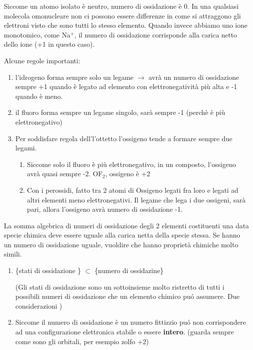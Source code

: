 \documentclass[a4paper]{article}
\begin{document}
Siccome un atomo isolato è neutro, numero di ossidazione è 0. In una qualsiasi molecola omonucleare non ci possono essere differenze in come si attraggono gli elettroni visto che sono tutti lo stesso elemento. Quando invece abbiamo uno ione monotomico, come Na$^+$, il numero di ossidazione corrisponde alla carica netto dello ione (+1 in questo caso).

Alcune regole importanti:
\begin{enumerate}
    \item l'idrogeno forma sempre solo un legame $\rightarrow$ avrà un numero di ossidazione sempre +1 quando è legato ad elemento con elettronegatività più alta e -1 quando è meno. 
    \item il fluoro forma sempre un legame singolo, sarà sempre -1 (perchè è più elettronegativo)
    \item Per soddisfare regola dell'l'ottetto l'ossigeno tende a formare sempre due legami. \begin{enumerate}
        \item Siccome solo il fluoro è più elettronegativo, in un composto, l'ossigeno avrà quasi sempre -2. OF$_2$, ossigeno è +2
        \item Con i perossidi, fatto tra 2 atomi di Ossigeno legati fra loro e legati ad altri elementi meno elettronegativi. Il legame che lega i due ossigeni, sarà pari, allora l'ossigeno avrà numero di ossidazione -1. 
    \end{enumerate}
\end{enumerate}

La somma algebrica di numeri di ossidazione degli 2 elementi costituenti una data specie chimica deve essere uguale alla carica netta della specie stessa. Se hanno un numero di ossidazione uguale, vuoldire che hanno proprietà chimiche molto simili. 

\begin{enumerate}
    \item \{stati di ossidazione \} $\subset$ \{numero di ossidazine\}  
    
    (Gli stati di ossidazione sono un sottoinsieme molto ristretto di tutti i possibili numeri di ossidazione che un elemento chimico puó assumere. 
Due considerazioni )
    \item Siccome il numero di ossidazione è un numero fittizzio puó non corrispondere ad una configurazione elettronica stabile o essere \textbf{intero}. (guarda sempre come sono gli orbitali, per esempio zolfo +2)
\end{enumerate}
\end{document}
